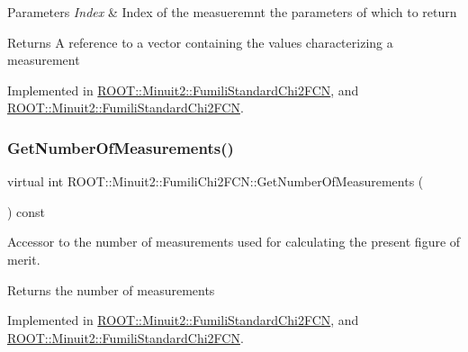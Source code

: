 \begin{DoxyParams}{Parameters}
{\em Index} & Index of the measueremnt the parameters of which to return \\
\hline
\end{DoxyParams}
\begin{DoxyReturn}{Returns}
A reference to a vector containing the values characterizing a measurement 
\end{DoxyReturn}


Implemented in \mbox{\hyperlink{classROOT_1_1Minuit2_1_1FumiliStandardChi2FCN_aed6181ee2996e090bc4aeb267771390e}{R\+O\+O\+T\+::\+Minuit2\+::\+Fumili\+Standard\+Chi2\+F\+CN}}, and \mbox{\hyperlink{classROOT_1_1Minuit2_1_1FumiliStandardChi2FCN_a3bbc9a9cb77ce45aa764aa1f6e74349c}{R\+O\+O\+T\+::\+Minuit2\+::\+Fumili\+Standard\+Chi2\+F\+CN}}.

\mbox{\label{classROOT_1_1Minuit2_1_1FumiliChi2FCN_afa1acb8484d1c1825de0dd641e301717}} 
\subsubsection{\texorpdfstring{GetNumberOfMeasurements()}{GetNumberOfMeasurements()}\hspace{0.1cm}{\footnotesize\ttfamily [1/2]}}
{\footnotesize\ttfamily virtual int R\+O\+O\+T\+::\+Minuit2\+::\+Fumili\+Chi2\+F\+C\+N\+::\+Get\+Number\+Of\+Measurements (\begin{DoxyParamCaption}{ }\end{DoxyParamCaption}) const\hspace{0.3cm}{\ttfamily [pure virtual]}}

Accessor to the number of measurements used for calculating the present figure of merit.

\begin{DoxyReturn}{Returns}
the number of measurements 
\end{DoxyReturn}


Implemented in \mbox{\hyperlink{classROOT_1_1Minuit2_1_1FumiliStandardChi2FCN_a27414beb35c9c18156e6b3781aaf587f}{R\+O\+O\+T\+::\+Minuit2\+::\+Fumili\+Standard\+Chi2\+F\+CN}}, and \mbox{\hyperlink{classROOT_1_1Minuit2_1_1FumiliStandardChi2FCN_a868b7c1aa7d2597db475ca99799c9131}{R\+O\+O\+T\+::\+Minuit2\+::\+Fumili\+Standard\+Chi2\+F\+CN}}.

